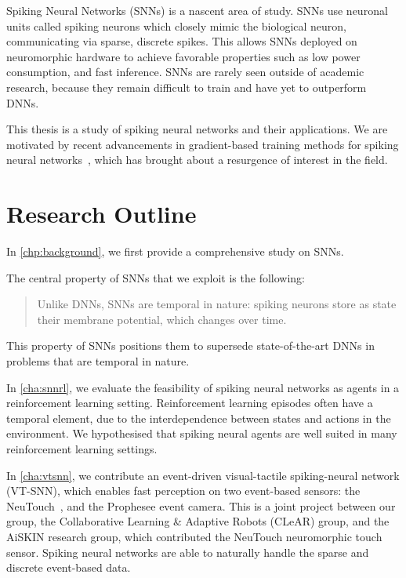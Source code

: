 \documentclass[fyp]{socreport}
\begin{document}
Spiking Neural Networks (SNNs) is a nascent area of study. SNNs use neuronal
units called spiking neurons which closely mimic the biological neuron,
communicating via sparse, discrete spikes. This allows SNNs deployed on
neuromorphic hardware to achieve favorable properties such as low power
consumption, and fast inference. SNNs are rarely seen outside of academic
research, because they remain difficult to train and have yet to outperform
DNNs.

This thesis is a study of spiking neural networks and their applications. We are
motivated by recent advancements in gradient-based training methods for spiking
neural
networks~\cite{NIPS2018_7415,NIPS2018_7417,neftci19_surrog_gradien_learn_spikin_neural_networ},
which has brought about a resurgence of interest in the field.

\section{Research Outline}

In \autoref{chp:background}, we first provide a comprehensive study on SNNs.

The central property of SNNs that we exploit is the following:

\begin{quote}
  Unlike DNNs, SNNs are temporal in nature: spiking neurons store as state their
  membrane potential, which changes over time.
\end{quote}

This property of SNNs positions them to supersede state-of-the-art DNNs in
problems that are temporal in nature.

In \autoref{cha:snnrl}, we evaluate the feasibility of spiking neural networks
as agents in a reinforcement learning setting. Reinforcement learning episodes
often have a temporal element, due to the interdependence between states and
actions in the environment. We hypothesised that spiking neural agents are well
suited in many reinforcement learning settings.

In \autoref{cha:vtsnn}, we contribute an event-driven visual-tactile
spiking-neural network (VT-SNN), which enables fast perception on two
event-based sensors: the NeuTouch~\cite{aiskinLee}, and the Prophesee event
camera. This is a joint project between our group, the Collaborative Learning \&
Adaptive Robots (CLeAR) group, and the AiSKIN research group, which contributed
the NeuTouch neuromorphic touch sensor. Spiking neural networks are able to
naturally handle the sparse and discrete event-based data.
\end{document}
